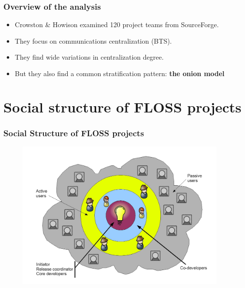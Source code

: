 \documentclass{beamer}
\begin{document}

\begin{frame}
 \frametitle{Overview of the analysis}
 \begin{itemize}
 \item Crowston \& Howison examined 120 project teams from
SourceForge.
 \item They focus on communications centralization (BTS).
 \item They find wide variations in centralization degree.
 \item But they also find a common stratification pattern:
  \textbf{the onion model}
 \end{itemize}
\end{frame}


\section{Social structure of FLOSS projects}


\begin{frame}
\frametitle{Social Structure of FLOSS projects}
\begin{center}
\begin{figure}
 \includegraphics[height=7.5cm]{figs/onion-model.jpg}
\end{figure}
\end{center}
\end{frame}

\end{document}
